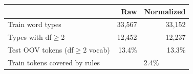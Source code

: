\begin{tabular}{lrr}
\toprule
 & Raw & Normalized\\
\midrule
Train word types & 33,567 & 33,152\\
Types with df$\ge$2 & 12,452 & 12,237\\
Test OOV tokens (df$\ge$2 vocab) & 13.4\% & 13.3\%\\
Train tokens covered by rules & \multicolumn{2}{c}{2.4\%}\\
\bottomrule
\end{tabular}
